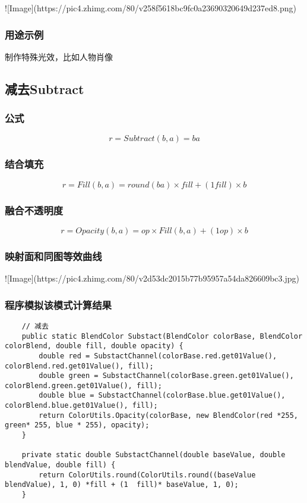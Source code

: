 ![Image](https://pic4.zhimg.com/80/v258f5618bc9fc0a23690320649d237ed8.png)

\subsubsection{ 用途示例}

制作特殊光效，比如人物肖像

\subsection{ 减去Subtract}

\subsubsection{ 公式}

$$r=Subtract(b,a)= ba$$

\subsubsection{ 结合填充}

$$r=Fill(b,a)=round(ba)\times fill + (1fill)\times b$$

\subsubsection{ 融合不透明度}

$$r=Opacity(b,a)=op\times Fill(b,a)+(1op)\times b$$

\subsubsection{ 映射面和同图等效曲线}

![Image](https://pic4.zhimg.com/80/v2d53dc2015b77b95957a54da826609bc3.jpg)

\subsubsection{ 程序模拟该模式计算结果}

\begin{lstlisting}
	// 减去
	public static BlendColor Substact(BlendColor colorBase, BlendColor colorBlend, double fill, double opacity) {
		double red = SubstactChannel(colorBase.red.get01Value(), colorBlend.red.get01Value(), fill);
		double green = SubstactChannel(colorBase.green.get01Value(), colorBlend.green.get01Value(), fill);
		double blue = SubstactChannel(colorBase.blue.get01Value(), colorBlend.blue.get01Value(), fill);
		return ColorUtils.Opacity(colorBase, new BlendColor(red *255, green* 255, blue * 255), opacity);
	}
	
	private static double SubstactChannel(double baseValue, double blendValue, double fill) {
		return ColorUtils.round(ColorUtils.round((baseValue  blendValue), 1, 0) *fill + (1  fill)* baseValue, 1, 0);
	}
\end{lstlisting}



